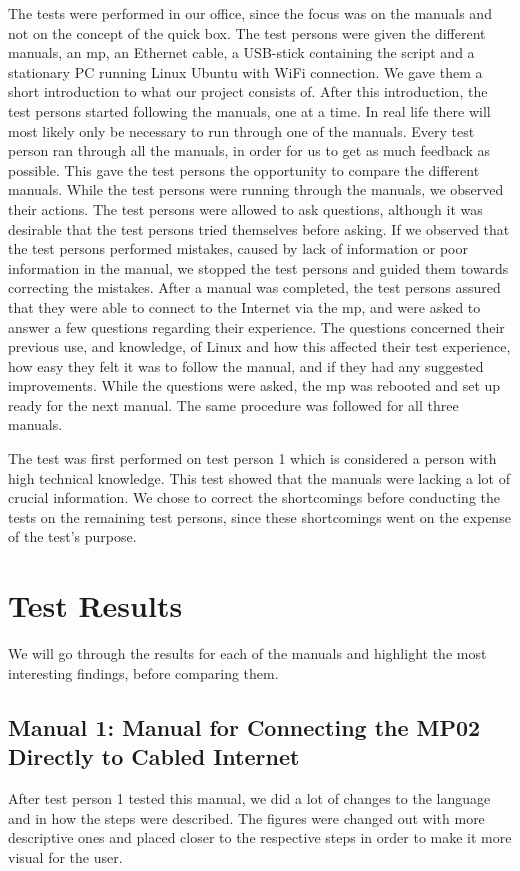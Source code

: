 The tests were performed in our office, since the focus was on the manuals and not on the concept of the \gls{quick} box. The test persons were given the different manuals, an \gls{mp}, an Ethernet cable, a USB-stick containing the script and a stationary PC running Linux Ubuntu with WiFi connection. We gave them a short introduction to what our project consists of. After this introduction, the test persons started following the manuals, one at a time. In real life there will most likely only be necessary to run through one of the manuals. Every test person ran through all the manuals, in order for us to get as much feedback as possible. This gave the test persons the opportunity to compare the different manuals. While the test persons were running through the manuals, we observed their actions. The test persons were allowed to ask questions, although it was desirable that the test persons tried themselves before asking. If we observed that the test persons performed mistakes, caused by lack of information or poor information in the manual, we stopped the test persons and guided them towards correcting the mistakes. After a manual was completed, the test persons assured that they were able to connect to the Internet via the \gls{mp}, and were asked to answer a few questions regarding their experience. The questions concerned their previous use, and knowledge, of Linux and how this affected their test experience, how easy they felt it was to follow the manual, and if they had any suggested improvements.
While the questions were asked, the \gls{mp} was rebooted and set up ready for the next manual. The same procedure was followed for all three  manuals. 

The test was first performed on test person 1 which is considered a person with high technical knowledge. This test showed that the manuals were lacking a lot of crucial information. We chose to correct the shortcomings before conducting the tests on the remaining test persons, since these shortcomings went on the expense of the test's purpose. 

\section{Test Results}
We will go through the results for each of the manuals and highlight the most interesting findings, before comparing them. 
 
\subsection{Manual 1: Manual for Connecting the MP02 Directly to Cabled Internet}
After test person 1 tested this manual, we did a lot of changes to the language and in how the steps were described. The figures were changed out with more descriptive ones and placed closer to the respective steps in order to make it more visual for the user. 

